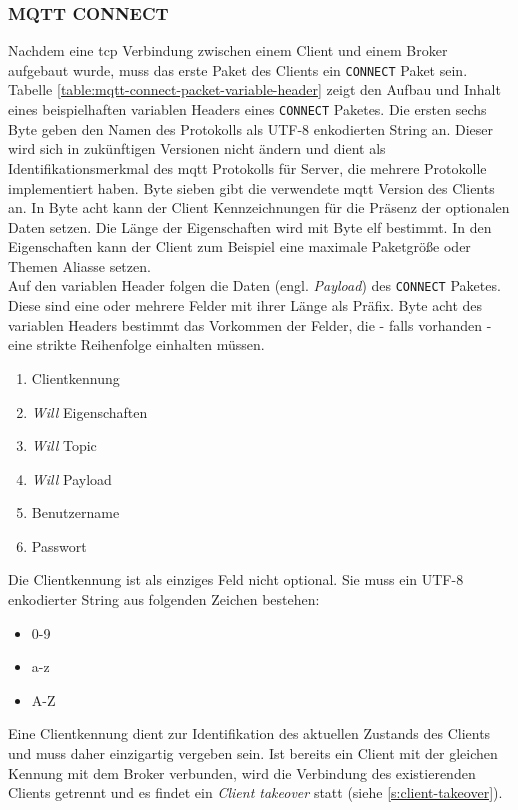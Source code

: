 \subsubsection{MQTT CONNECT} \label{s:mqtt-connect}
Nachdem eine \ac{tcp} Verbindung zwischen einem Client und einem Broker aufgebaut wurde, muss das erste Paket des Clients ein \verb|CONNECT| Paket sein.
Tabelle \ref{table:mqtt-connect-packet-variable-header} zeigt den Aufbau und Inhalt eines beispielhaften variablen Headers eines \verb|CONNECT| Paketes.
Die ersten sechs Byte geben den Namen des Protokolls als UTF-8 enkodierten String an. Dieser wird sich in zukünftigen Versionen nicht ändern und dient als Identifikationsmerkmal des \ac{mqtt} Protokolls für Server, die mehrere Protokolle implementiert haben. Byte sieben gibt die verwendete \ac{mqtt} Version des Clients an. In Byte acht kann der Client Kennzeichnungen für die Präsenz der optionalen Daten setzen. Die Länge der Eigenschaften wird mit Byte elf bestimmt. In den Eigenschaften kann der Client zum Beispiel eine maximale Paketgrö{\ss}e oder Themen Aliasse setzen.\cite{mqtt5Specification}\\
Auf den variablen Header folgen die Daten (engl. \textit{Payload}) des \verb|CONNECT| Paketes. Diese sind eine oder mehrere Felder mit ihrer Länge als Präfix. Byte acht des variablen Headers bestimmt das Vorkommen der Felder, die - falls vorhanden - eine strikte Reihenfolge einhalten müssen.
\cite{mqtt5Specification}
\begin{enumerate}
    \item Clientkennung
    \item \textit{Will} Eigenschaften
    \item \textit{Will} Topic
    \item \textit{Will} Payload
    \item Benutzername
    \item Passwort
\end{enumerate}
Die Clientkennung ist als einziges Feld nicht optional. Sie muss ein UTF-8 enkodierter String aus folgenden Zeichen bestehen:
\begin{itemize}
    \item 0-9
    \item a-z
    \item A-Z
\end{itemize}
Eine Clientkennung dient zur Identifikation des aktuellen Zustands des Clients und muss daher einzigartig vergeben sein. Ist bereits ein Client mit der gleichen Kennung mit dem Broker verbunden, wird die Verbindung des existierenden Clients getrennt und es findet ein \textit{Client takeover} statt (siehe \ref{s:client-takeover}).
